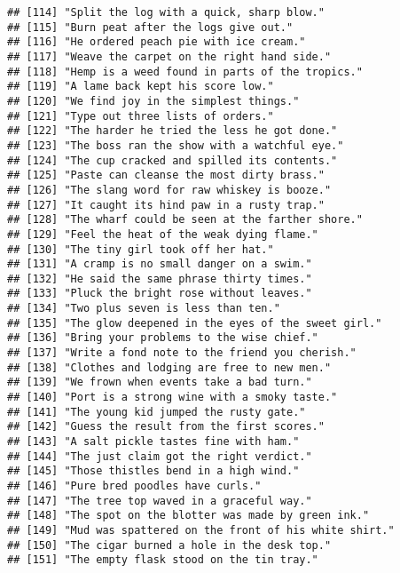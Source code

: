 \documentclass[
]{article}
\begin{document}
\begin{verbatim}
## [114] "Split the log with a quick, sharp blow."                  
## [115] "Burn peat after the logs give out."                       
## [116] "He ordered peach pie with ice cream."                     
## [117] "Weave the carpet on the right hand side."                 
## [118] "Hemp is a weed found in parts of the tropics."            
## [119] "A lame back kept his score low."                          
## [120] "We find joy in the simplest things."                      
## [121] "Type out three lists of orders."                          
## [122] "The harder he tried the less he got done."                
## [123] "The boss ran the show with a watchful eye."               
## [124] "The cup cracked and spilled its contents."                
## [125] "Paste can cleanse the most dirty brass."                  
## [126] "The slang word for raw whiskey is booze."                 
## [127] "It caught its hind paw in a rusty trap."                  
## [128] "The wharf could be seen at the farther shore."            
## [129] "Feel the heat of the weak dying flame."                   
## [130] "The tiny girl took off her hat."                          
## [131] "A cramp is no small danger on a swim."                    
## [132] "He said the same phrase thirty times."                    
## [133] "Pluck the bright rose without leaves."                    
## [134] "Two plus seven is less than ten."                         
## [135] "The glow deepened in the eyes of the sweet girl."         
## [136] "Bring your problems to the wise chief."                   
## [137] "Write a fond note to the friend you cherish."             
## [138] "Clothes and lodging are free to new men."                 
## [139] "We frown when events take a bad turn."                    
## [140] "Port is a strong wine with a smoky taste."                
## [141] "The young kid jumped the rusty gate."                     
## [142] "Guess the result from the first scores."                  
## [143] "A salt pickle tastes fine with ham."                      
## [144] "The just claim got the right verdict."                    
## [145] "Those thistles bend in a high wind."                      
## [146] "Pure bred poodles have curls."                            
## [147] "The tree top waved in a graceful way."                    
## [148] "The spot on the blotter was made by green ink."           
## [149] "Mud was spattered on the front of his white shirt."       
## [150] "The cigar burned a hole in the desk top."                 
## [151] "The empty flask stood on the tin tray."                   

\end{verbatim}
\end{document}
